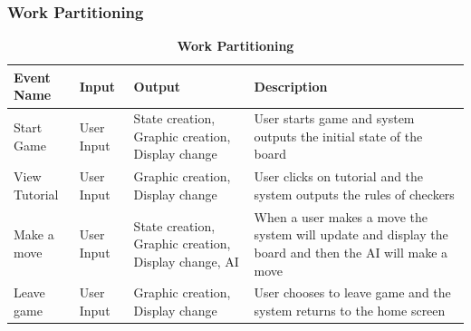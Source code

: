 \documentclass[12pt, titlepage]{article}
\begin{document}
\subsubsection{Work Partitioning}

\begin{table}[h!]
    \begin{center}
	\caption{\bf Work Partitioning}
	\begin{adjustwidth}{-1.5cm}{}
	\begin{tabularx}{1.2\textwidth}{p{2.5cm}p{2.1cm}p{3.4cm}X}
		\toprule {\bf Event Name}  & {\bf Input} & {\bf Output} & {\bf Description} \\
		\midrule
		Start Game & User Input & State creation, Graphic creation, Display change & User starts game and system outputs the initial state of the board\\
		View Tutorial & User Input & Graphic creation, Display change & User clicks on tutorial and the system outputs the rules of checkers\\
		Make a move & User Input & State creation, Graphic creation, Display change, AI & When a user makes a move the system will update and display the board and then the AI will make a move \\
		Leave game & User Input & Graphic creation, Display change & User chooses to leave game and the system returns to the home screen\\
		\bottomrule
	\end{tabularx}
	\end{adjustwidth}
	\end{center}
\end{table}
\end{document}
